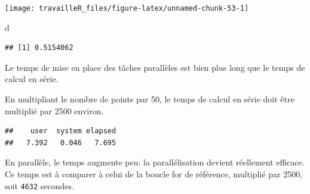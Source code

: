 \documentclass[
  12pt,
  french,
  a4paper,
  extrafontsizes,onecolumn,openright
  ]{memoir}
\newenvironment{Shaded}{\begin{snugshade}}{\end{snugshade}}
\newcommand{\DecValTok}[1]{\textcolor[rgb]{0.00,0.00,0.81}{#1}}
\newcommand{\KeywordTok}[1]{\textcolor[rgb]{0.13,0.29,0.53}{\textbf{#1}}}
\newcommand{\NormalTok}[1]{#1}
\newcommand{\OperatorTok}[1]{\textcolor[rgb]{0.81,0.36,0.00}{\textbf{#1}}}
\newcommand{\StringTok}[1]{\textcolor[rgb]{0.31,0.60,0.02}{#1}}
\begin{document}
\begin{center}\texttt{[image: travailleR\_files/figure-latex/unnamed-chunk-53-1]} \end{center}

\begin{Shaded}
\begin{Highlighting}[]
\NormalTok{d}
\end{Highlighting}
\end{Shaded}

\begin{verbatim}
## [1] 0.5154062
\end{verbatim}

\normalsize

Le temps de mise en place des tâches parallèles est bien plus long que le temps de calcul en série.

En multipliant le nombre de points par 50, le temps de calcul en série doit être multiplié par 2500 environ.

\scriptsize

\begin{Shaded}
\end{Shaded}

\begin{verbatim}
##    user  system elapsed 
##   7.392   0.046   7.695
\end{verbatim}

\normalsize

En parallèle, le temps augmente peu: la parallélisation devient réellement efficace.
Ce temps est à comparer à celui de la boucle for de référence, multiplié par 2500, soit \texttt{4632} secondes.

\scriptsize

\begin{Shaded}
\end{Shaded}
\end{document}
